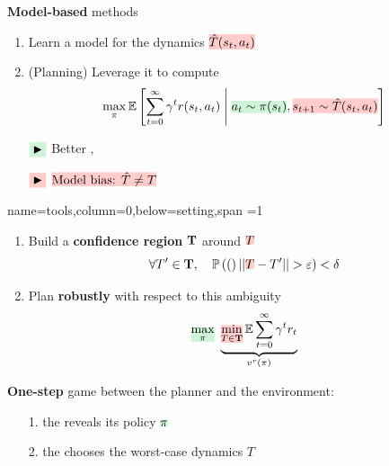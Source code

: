 \documentclass[paperwidth=36in, paperheight=48in,portrait,fontscale=0.35, margin=2cm]{baposter}
\begin{document}
\begin{poster}
{    \textbf{Model-based} methods
    \begin{enumerate}[itemsep=0pt]
        \item Learn a model for the dynamics $\hler{\hat{T}(s_t, a_t)}$
        \item (Planning) Leverage it to compute
        \begin{equation*}
        \max_\pi \expectedvalue \left[\sum_{t=0}^\infty \gamma^t r(s_t, a_t) \condbar \hleg{a_t\sim\pi(s_t)}, \hler{s_{t+1}\sim \hat{T}(s_t, a_t)}\right]
        \end{equation*}
    \end{enumerate}


    \begin{itemize}[nolistsep]
        \item[$\eqgcolb{\blacktriangleright}$] Better , 
        \item[$\eqrcolb{\blacktriangleright}$] $\hler{\text{Model bias: }\hat{T} \neq T}$
    \end{itemize}

}

{name=tools,column=0,below=setting,span =1}
{
\begin{enumerate}[nolistsep]
    \item Build a \textbf{confidence region} $\mathbf{T}$ around $\hler{T}$
    \begin{equation*}
    \forall T'\in \bT, \quad \probability(||\hler{T} - T'|| > \epsilon) < \delta
    \end{equation*}
    \item Plan \textbf{robustly} with respect to this ambiguity
    \begin{equation}
        \hleg{\max_{\pi}}\ \underbrace{\hler{\min_{T\in \bT}} \expectedvalue \sum_{t=0}^\infty \gamma^t r_t}_{v^r(\pi)} 
    \end{equation}
\end{enumerate}

\textbf{One-step} game between the planner and the environment:
\begin{itemize}[nolistsep]
    \item[1.] the  reveals its policy $\hleg{\pi}$
    \item[2.] the  chooses the worst-case dynamics $T$
\end{itemize}

}
\end{poster}
\end{document}
